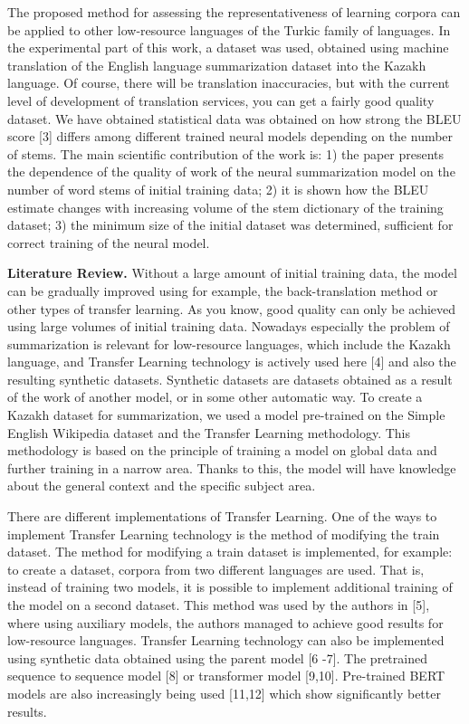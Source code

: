 \begin{multicols}{2}
The proposed method for assessing the representativeness of learning
corpora can be applied to other low-resource languages
\hspace{0pt}\hspace{0pt}of the Turkic family of languages. In the
experimental part of this work, a dataset was used, obtained using
machine translation of the English language summarization dataset into
the Kazakh language. Of course, there will be translation inaccuracies,
but with the current level of development of translation services, you
can get a fairly good quality dataset. We have obtained statistical data
was obtained on how strong the BLEU score {[}3{]} differs among
different trained neural models depending on the number of stems. The
main scientific contribution of the work is: 1) the paper presents the
dependence of the quality of work of the neural summarization model on
the number of word stems of initial training data; 2) it is shown how
the BLEU estimate changes with increasing volume of the stem dictionary
of the training dataset; 3) the minimum size of the initial dataset was
determined, sufficient for correct training of the neural model.

{\bfseries Literature Review.} Without a large amount of initial training
data, the model can be gradually improved using for example, the
back-translation method or other types of transfer learning. As you
know, good quality can only be achieved using large volumes of initial
training data. Nowadays especially the problem of summarization is
relevant for low-resource languages, which include the Kazakh language,
and Transfer Learning technology is actively used here {[}4{]} and also
the resulting synthetic datasets. Synthetic datasets are datasets
obtained as a result of the work of another model, or in some other
automatic way. To create a Kazakh dataset for summarization, we used a
model pre-trained on the Simple English Wikipedia dataset and the
Transfer Learning methodology. This methodology is based on the
principle of training a model on global data and further training in a
narrow area. Thanks to this, the model will have knowledge about the
general context and the specific subject area.

There are different implementations of Transfer Learning. One of the
ways to implement Transfer Learning technology is the method of
modifying the train dataset. The method for modifying a train dataset is
implemented, for example: to create a dataset, corpora from two
different languages \hspace{0pt}\hspace{0pt}are used. That is, instead
of training two models, it is possible to implement additional training
of the model on a second dataset. This method was used by the authors in
{[}5{]}, where using auxiliary models, the authors managed to achieve
good results for low-resource languages. Transfer Learning technology
can also be implemented using synthetic data obtained using the parent
model {[}6 -7{]}. The pretrained sequence to sequence model {[}8{]} or
transformer model {[}9,10{]}. Pre-trained BERT models are also
increasingly being used {[}11,12{]} which show significantly better
results.


\end{multicols}
